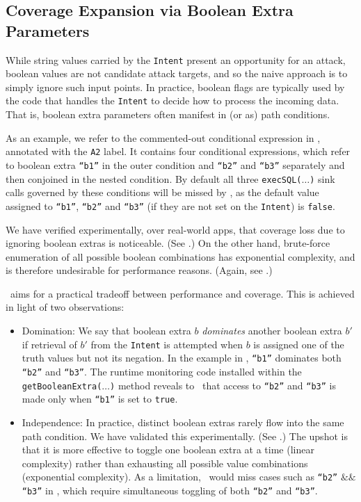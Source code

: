 \subsection{Coverage Expansion via Boolean Extra Parameters}\label{Se:coverBools}

While string values carried by the {\tt Intent} present an opportunity for an attack, boolean values are not candidate attack targets, and so the naive approach is to simply ignore such input points. In practice, boolean flags are typically used by the code that handles the {\tt Intent} to decide how to process the incoming data. That is, boolean extra parameters often manifest in (or as) path conditions.

As an example, we refer to the commented-out conditional expression in , annotated with the {\tt A2} label. It contains four conditional expressions, which refer to boolean extra {\tt ``b1''} in the outer condition and {\tt ``b2''} and {\tt ``b3''} separately and then conjoined in the nested condition. By default all three {\tt execSQL($\ldots$)} sink calls governed by these conditions will be missed by \Tool, as the default value assigned to {\tt ``b1''}, {\tt ``b2''} and {\tt ``b3''} (if they are not set on the {\tt Intent}) is {\tt false}. 

We have verified experimentally, over real-world apps, that coverage loss due to ignoring boolean extras is noticeable. (See .) On the other hand, 
brute-force enumeration of all possible boolean combinations has exponential complexity, and is therefore undesirable for performance reasons. (Again, see .) 

\Tool\ aims for a practical tradeoff between performance and coverage. This is achieved in light of two observations:
\begin{itemize}
	\item Domination: We say that boolean extra $b$ \emph{dominates} another boolean extra $b'$ if retrieval of $b'$ from the {\tt Intent} is attempted when $b$ is assigned one of the truth values but not its negation. In the example in , {\tt ``b1''} dominates both {\tt ``b2''} and {\tt ``b3''}. The runtime monitoring code installed within the {\tt getBooleanExtra($\ldots$)} method reveals to \Tool\ that access to {\tt ``b2''} and {\tt ``b3''} is made only when {\tt ``b1''} is set to {\tt true}.
	\item Independence: In practice, distinct boolean extras rarely flow into the same path condition. We have validated this experimentally. (See .) The upshot is that it is more effective to toggle one boolean extra at a time (linear complexity) rather than exhausting all possible value combinations (exponential complexity). As a limitation, \Tool\ would miss cases such as {\tt ``b2''} $\&\&$ {\tt ``b3''} in , which require simultaneous toggling of both {\tt ``b2''} and {\tt ``b3''}.
\end{itemize}

